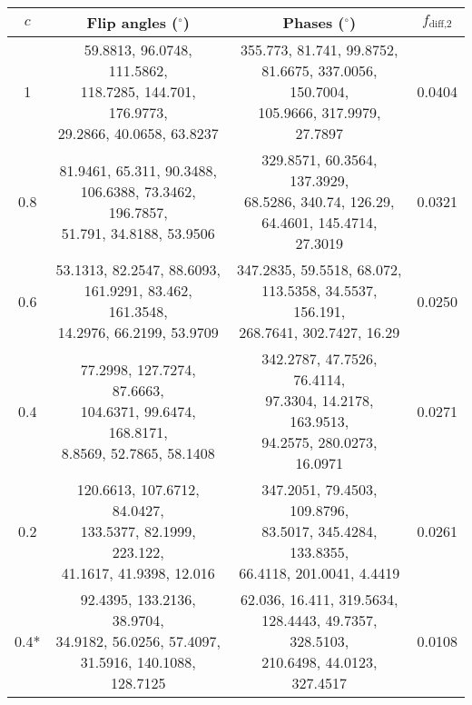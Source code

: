 \begin{table}[htb]
    \begin{tabular}{cccc}
        \toprule
        $c$ & \textbf{Flip angles} ($^\circ$) & \textbf{Phases} ($^\circ$) & $f_\text{diff,2}$ \\
        \midrule
        1 & \makecell{59.8813, 96.0748, 111.5862, \\ 118.7285, 144.701, 176.9773, \\ 29.2866, 40.0658, 63.8237} & \makecell{355.773, 81.741, 99.8752, \\ 81.6675, 337.0056, 150.7004, \\ 105.9666, 317.9979, 27.7897} & 0.0404 \\
        \midrule
        0.8 & \makecell{81.9461, 65.311, 90.3488, \\ 106.6388, 73.3462, 196.7857, \\ 51.791, 34.8188, 53.9506} & \makecell{329.8571, 60.3564, 137.3929, \\ 68.5286, 340.74, 126.29, \\ 64.4601, 145.4714, 27.3019} & 0.0321 \\
        \midrule
        0.6 & \makecell{53.1313, 82.2547, 88.6093, \\ 161.9291, 83.462, 161.3548, \\ 14.2976, 66.2199, 53.9709} & \makecell{347.2835, 59.5518, 68.072, \\ 113.5358, 34.5537, 156.191, \\ 268.7641, 302.7427, 16.29} & 0.0250 \\
        \midrule
        0.4 & \makecell{77.2998, 127.7274, 87.6663, \\ 104.6371, 99.6474, 168.8171, \\ 8.8569, 52.7865, 58.1408} & \makecell{342.2787, 47.7526, 76.4114, \\ 97.3304, 14.2178, 163.9513, \\ 94.2575, 280.0273, 16.0971} & 0.0271 \\
        \midrule
        0.2 & \makecell{120.6613, 107.6712, 84.0427, \\ 133.5377, 82.1999, 223.122, \\ 41.1617, 41.9398, 12.016} & \makecell{347.2051, 79.4503, 109.8796, \\ 83.5017, 345.4284, 133.8355, \\ 66.4118, 201.0041, 4.4419} & 0.0261 \\
        \midrule
        0.4* & \makecell{92.4395, 133.2136, 38.9704, \\ 34.9182, 56.0256, 57.4097, \\ 31.5916, 140.1088, 128.7125} & \makecell{62.036, 16.411, 319.5634, \\ 128.4443, 49.7357, 328.5103, \\ 210.6498, 44.0123, 327.4517} & 0.0108 \\

\end{tabular}
\end{table}
